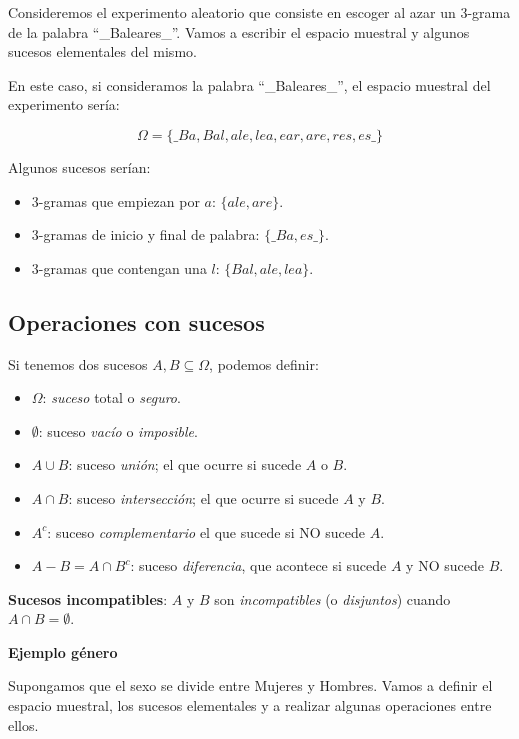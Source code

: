 \documentclass[]{book}
\providecommand{\tightlist}{%
  \setlength{\itemsep}{0pt}\setlength{\parskip}{0pt}}
\begin{document}
Consideremos el experimento aleatorio que consiste en escoger al azar un 3-grama de la palabra ``\_Baleares\_''. Vamos a escribir el espacio muestral y algunos sucesos elementales del mismo.

En este caso, si consideramos la palabra ``\_Baleares\_'', el espacio muestral del experimento sería:

\[\Omega=\{\_Ba, Bal, ale, lea, ear, are, res, es\_\}\]

Algunos sucesos serían:

\begin{itemize}
\tightlist
\item
  3-gramas que empiezan por \(a\): \(\{ale,are\}\).
\item
  3-gramas de inicio y final de palabra: \(\{\_Ba,es\_\}\).
\item
  3-gramas que contengan una \(l\): \(\{Bal,ale,lea\}\).
\end{itemize}

\hypertarget{operaciones-con-sucesos}{%
\subsection{Operaciones con sucesos}\label{operaciones-con-sucesos}}

Si tenemos dos sucesos \(A,B\subseteq \Omega\), podemos definir:

\begin{itemize}
\tightlist
\item
  \(\Omega\): \emph{suceso} total o \emph{seguro}.
\item
  \(\emptyset\): suceso \emph{vacío} o \emph{imposible}.
\item
  \(A\cup B\): suceso \emph{unión}; el que ocurre si sucede \(A\) o \(B\).
\item
  \(A\cap B\): suceso \emph{intersección}; el que ocurre si sucede \(A\) y \(B\).
\item
  \(A^c\): suceso \emph{complementario} el que sucede si NO sucede \(A\).
\item
  \(A- B=A\cap B^c\): suceso \emph{diferencia}, que acontece si sucede \(A\) y NO sucede \(B\).
\end{itemize}

 \textbf{Sucesos incompatibles}: \(A\) y \(B\) son \emph{incompatibles} (o \emph{disjuntos}) cuando \(A\cap B=\emptyset\).

\textbf{Ejemplo género}

Supongamos que el sexo se divide entre Mujeres y Hombres. Vamos a definir el espacio muestral, los sucesos elementales y a realizar algunas operaciones entre ellos.
\end{document}
